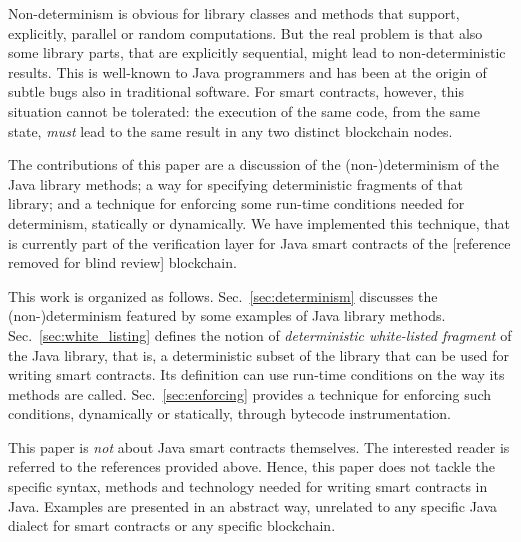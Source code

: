 Non-determinism is obvious for library classes and methods that support, explicitly,
parallel or random computations. But the real problem is that
also some library parts, that are explicitly sequential, might lead to
non-deterministic results.
This is well-known to Java programmers and has been at the origin of subtle
bugs also in traditional software. For smart contracts, however,
this situation cannot be tolerated: the execution of the same code, from the same state,
\emph{must} lead to the same result in any two distinct blockchain nodes.

The contributions of this paper are a discussion of the (non-)determinism
of the Java library methods; a way for specifying deterministic fragments
of that library; and a technique for
enforcing some run-time conditions needed for determinism, statically or dynamically.
We have implemented this technique, that is currently part of the verification
layer for Java smart contracts of the [reference removed for blind review] blockchain.

This work is organized as follows.
Sec.~\ref{sec:determinism} discusses the (non-)determinism featured by some
examples of Java library methods.
Sec.~\ref{sec:white_listing} defines the notion of \emph{deterministic white-listed fragment} of the Java library,
that is, a deterministic subset of the library that can be used for writing smart contracts.
Its definition can use run-time conditions on the way its methods are called.
Sec.~\ref{sec:enforcing} provides a technique for enforcing such conditions, dynamically
or statically, through bytecode instrumentation.

This paper is \emph{not} about Java smart contracts themselves. The interested reader
is referred to the references provided above. Hence, this paper does not tackle
the specific syntax, methods and technology needed for writing smart contracts in Java.
Examples are presented in an abstract way, unrelated to any specific
Java dialect for smart contracts or any specific blockchain.

